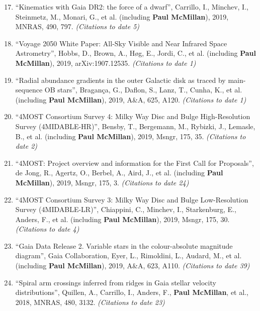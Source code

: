\documentclass{resume}
\begin{document}
\begin{enumerate}
\setcounter{enumi}{16}
\item ``Kinematics with Gaia DR2: the force of a dwarf'', Carrillo, I., Minchev, I., Steinmetz, M., Monari, G., et al. (including \textbf{Paul McMillan}), 2019, MNRAS, 490, 797. \textit{(Citations to date 5)}

\item ``Voyage 2050 White Paper: All-Sky Visible and Near Infrared Space Astrometry'', Hobbs, D., Brown, A., H{\o}g, E., Jordi, C., et al. (including \textbf{Paul McMillan}), 2019, arXiv:1907.12535. \textit{(Citations to date 1)}

\item ``Radial abundance gradients in the outer Galactic disk as traced by main-sequence OB stars'', Bragan\c{c}a, G., Daflon, S., Lanz, T., Cunha, K., et al. (including \textbf{Paul McMillan}), 2019, A\&A, 625, A120. \textit{(Citations to date 1)}

\item ``4MOST Consortium Survey 4: Milky Way Disc and Bulge High-Resolution Survey (4MIDABLE-HR)'', Bensby, T., Bergemann, M., Rybizki, J., Lemasle, B., et al. (including \textbf{Paul McMillan}), 2019, Msngr, 175, 35. \textit{(Citations to date 2)}

\item ``4MOST: Project overview and information for the First Call for Proposals'', de Jong, R., Agertz, O., Berbel, A., Aird, J., et al. (including \textbf{Paul McMillan}), 2019, Msngr, 175, 3. \textit{(Citations to date 24)}

\item ``4MOST Consortium Survey 3: Milky Way Disc and Bulge Low-Resolution Survey (4MIDABLE-LR)'', Chiappini, C., Minchev, I., Starkenburg, E., Anders, F., et al. (including \textbf{Paul McMillan}), 2019, Msngr, 175, 30. \textit{(Citations to date 4)}

\item ``Gaia Data Release 2. Variable stars in the colour-absolute magnitude diagram'', Gaia Collaboration, Eyer, L., Rimoldini, L., Audard, M., et al. (including \textbf{Paul McMillan}), 2019, A\&A, 623, A110. \textit{(Citations to date 39)}

\item ``Spiral arm crossings inferred from ridges in Gaia stellar velocity distributions'', Quillen, A., Carrillo, I., Anders, F., \textbf{Paul McMillan}, et al., 2018, MNRAS, 480, 3132. \textit{(Citations to date 23)}


\end{enumerate}
\end{document}
